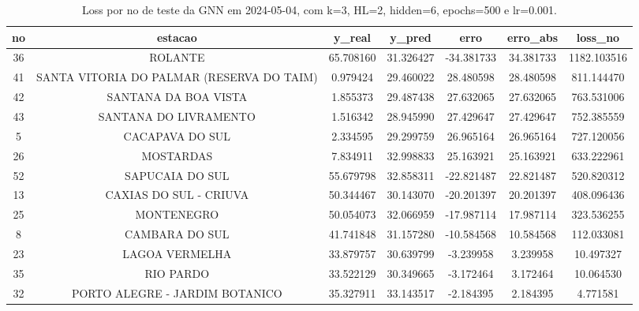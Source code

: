 \begin{table}[h]
\centering
\caption{Loss por no de teste da GNN em 2024-05-04, com k=3, HL=2, hidden=6, epochs=500 e lr=0.001.}
\label{tab:gnn_loss_k3_hl2_h6_e500_d20240504}
\begin{tabular}{ccccccc}
\toprule
no & estacao & y\_real & y\_pred & erro & erro\_abs & loss\_no \\
\midrule
36 & ROLANTE & 65.708160 & 31.326427 & -34.381733 & 34.381733 & 1182.103516 \\
41 & SANTA VITORIA DO PALMAR (RESERVA DO TAIM) & 0.979424 & 29.460022 & 28.480598 & 28.480598 & 811.144470 \\
42 & SANTANA DA BOA VISTA & 1.855373 & 29.487438 & 27.632065 & 27.632065 & 763.531006 \\
43 & SANTANA DO LIVRAMENTO & 1.516342 & 28.945990 & 27.429647 & 27.429647 & 752.385559 \\
5 & CACAPAVA DO SUL & 2.334595 & 29.299759 & 26.965164 & 26.965164 & 727.120056 \\
26 & MOSTARDAS & 7.834911 & 32.998833 & 25.163921 & 25.163921 & 633.222961 \\
52 & SAPUCAIA DO SUL & 55.679798 & 32.858311 & -22.821487 & 22.821487 & 520.820312 \\
13 & CAXIAS DO SUL - CRIUVA & 50.344467 & 30.143070 & -20.201397 & 20.201397 & 408.096436 \\
25 & MONTENEGRO & 50.054073 & 32.066959 & -17.987114 & 17.987114 & 323.536255 \\
8 & CAMBARA DO SUL & 41.741848 & 31.157280 & -10.584568 & 10.584568 & 112.033081 \\
23 & LAGOA VERMELHA & 33.879757 & 30.639799 & -3.239958 & 3.239958 & 10.497327 \\
35 & RIO PARDO & 33.522129 & 30.349665 & -3.172464 & 3.172464 & 10.064530 \\
32 & PORTO ALEGRE - JARDIM BOTANICO & 35.327911 & 33.143517 & -2.184395 & 2.184395 & 4.771581 \\
\bottomrule
\end{tabular}
\end{table}

